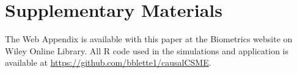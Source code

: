\documentclass[useAMS,usenatbib,referee]{biom}
\begin{document}








\section*{Supplementary Materials}

The Web Appendix is available with this paper at the Biometrics website on Wiley Online Library. All R code used in the simulations and application is available at \href{https://github.com/bblette1/causalCSME}{https://github.com/bblette1/causalCSME}.\vspace*{-8pt}

\label{lastpage}
\end{document}
